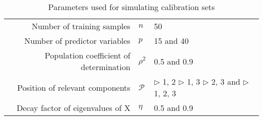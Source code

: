 \documentclass[12pt, a4paper]{article}
\begin{document}
\doublespacing

\begin{table}[ht]
  \centering
  \begin{tabular}{rll}
    Number of training samples              & $n$      & 50                \\
    Number of predictor variables           & $p$      & 15 and 40         \\
    Population coefficient of determination & $\rho^2$ & 0.5 and 0.9       \\
    Position of relevant components         & $\mathcal{P}$
                                            & $\triangleright$ 1, 2 \;
                                                         $\triangleright$ 1,  3 \; \newline
                                                         $\triangleright$ 2,  3 and \;
                                                         $\triangleright$ 1,  2, 3 \\
    Decay factor of eigenvalues of X        & $\eta$   & 0.5 and 0.9
  \end{tabular}
  \caption{Parameters used for simulating calibration sets}
  \label{tab:parameters}
\end{table}
\end{document}
